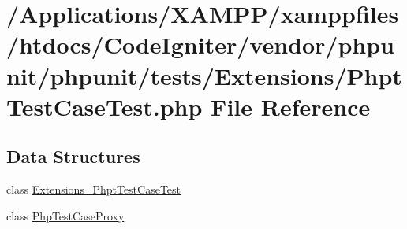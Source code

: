 \hypertarget{_phpt_test_case_test_8php}{}\section{/\+Applications/\+X\+A\+M\+P\+P/xamppfiles/htdocs/\+Code\+Igniter/vendor/phpunit/phpunit/tests/\+Extensions/\+Phpt\+Test\+Case\+Test.php File Reference}
\label{_phpt_test_case_test_8php}
\subsection*{Data Structures}
\begin{DoxyCompactItemize}
\item 
class \mbox{\hyperlink{class_extensions___phpt_test_case_test}{Extensions\+\_\+\+Phpt\+Test\+Case\+Test}}
\item 
class \mbox{\hyperlink{class_php_test_case_proxy}{Php\+Test\+Case\+Proxy}}
\end{DoxyCompactItemize}
